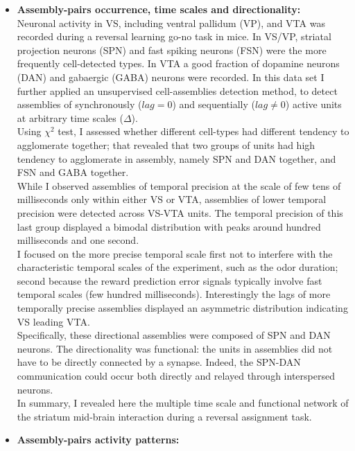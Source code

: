 \begin{itemize}
    \item \textbf{Assembly-pairs occurrence, time scales and directionality:}\\Neuronal activity in VS, including ventral pallidum (VP), and VTA was recorded during a reversal learning go-no task in mice. In VS/VP, striatal projection neurons (SPN) and fast spiking neurons (FSN) were the more frequently cell-detected types. In VTA a good fraction of dopamine neurons (DAN) and  gabaergic (GABA) neurons were recorded. In this data set I further applied an unsupervised cell-assemblies detection method, to detect assemblies of synchronously ($lag=0$) and sequentially ($lag\neq0$) active units at arbitrary time scales ($\Delta$).\\Using $\chi^2$ test, I assessed whether different cell-types had different tendency to agglomerate together; that revealed that two groups of units had high tendency to agglomerate in assembly, namely SPN and DAN together, and FSN and GABA together.\\While I observed assemblies of temporal precision at the scale of few tens of milliseconds only within either VS or VTA, assemblies of lower temporal precision were detected across VS-VTA units. The temporal precision of this last group displayed a bimodal distribution with peaks around hundred milliseconds and one second.\\I focused on the more precise temporal scale first not to interfere with the characteristic temporal scales of the experiment, such as the odor duration; second because the reward prediction error signals typically involve fast temporal scales (few hundred milliseconds). Interestingly the lags of more temporally precise assemblies displayed an asymmetric distribution indicating VS leading VTA.\\ Specifically, these directional assemblies were composed of SPN and DAN neurons. The directionality was functional: the units in assemblies did not have to be directly connected by a synapse. Indeed, the SPN-DAN communication could occur both directly and relayed through interspersed neurons.\\In summary, I revealed here the multiple time scale and functional network of the striatum mid-brain interaction during a reversal assignment task.  
    \item \textbf{Assembly-pairs activity patterns:}\\

\end{itemize}
